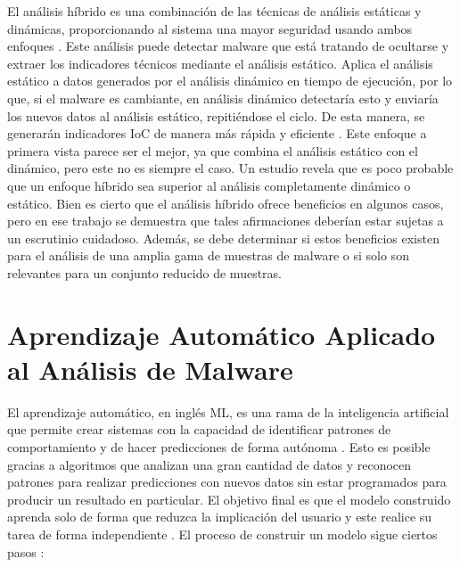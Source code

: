 \noindent El análisis híbrido es una combinación de las técnicas de análisis estáticas y dinámicas, proporcionando al sistema una mayor seguridad usando ambos enfoques \cite{111}. Este análisis puede detectar malware que está tratando de ocultarse y extraer los indicadores técnicos mediante el análisis estático. Aplica el análisis estático a datos generados por el análisis dinámico en tiempo de ejecución, por lo que, si el malware es cambiante, en análisis dinámico detectaría esto y enviaría los nuevos datos al análisis estático, repitiéndose el ciclo. De esta manera, se generarán indicadores \gls{IoC} de manera más rápida y eficiente \cite{89}. Este enfoque a primera vista parece ser el mejor, ya que combina el análisis estático con el dinámico, pero este no es siempre el caso. Un estudio \cite{120} revela que es poco probable que un enfoque híbrido sea superior al análisis completamente dinámico o estático. Bien es cierto que el análisis híbrido ofrece beneficios en algunos casos, pero en ese trabajo se demuestra que tales afirmaciones deberían estar sujetas a un escrutinio cuidadoso. Además, se debe determinar si estos beneficios existen para el análisis de una amplia gama de muestras de malware o si solo son relevantes para un conjunto reducido de muestras.



\section{Aprendizaje Automático Aplicado al Análisis de Malware}
\label{sec:mlaplicado}


\noindent El aprendizaje automático, en inglés \gls{ML}, es una rama de la inteligencia artificial que permite crear sistemas con la capacidad de identificar patrones de comportamiento y de hacer predicciones de forma autónoma \cite{124}. Esto es posible gracias a algoritmos que analizan una gran cantidad de datos y reconocen patrones para realizar predicciones con nuevos datos sin estar programados para producir un resultado en particular. 
El objetivo final es que el modelo construido aprenda solo de forma que reduzca la implicación del usuario y este realice su tarea de forma independiente \cite{SML2018}. El proceso de construir un modelo sigue ciertos pasos \cite{Thomas_2020}:

